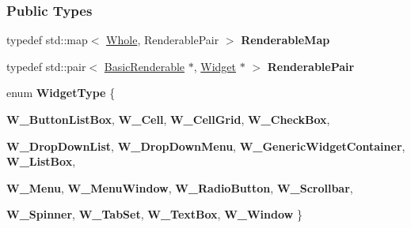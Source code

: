 \subsubsection*{Public Types}
\begin{DoxyCompactItemize}
\item 
\hypertarget{classMezzanine_1_1UI_1_1Widget_a282a075eb1009f0eea9ad51a1039629e}{
typedef std::map$<$ \hyperlink{namespaceMezzanine_adcbb6ce6d1eb4379d109e51171e2e493}{Whole}, RenderablePair $>$ {\bfseries RenderableMap}}
\label{classMezzanine_1_1UI_1_1Widget_a282a075eb1009f0eea9ad51a1039629e}

\item 
\hypertarget{classMezzanine_1_1UI_1_1Widget_ae53011568daa632baad850b24427f937}{
typedef std::pair$<$ \hyperlink{classMezzanine_1_1UI_1_1BasicRenderable}{BasicRenderable} $\ast$, \hyperlink{classMezzanine_1_1UI_1_1Widget}{Widget} $\ast$ $>$ {\bfseries RenderablePair}}
\label{classMezzanine_1_1UI_1_1Widget_ae53011568daa632baad850b24427f937}

\item 
enum {\bfseries WidgetType} \{ \par
{\bfseries W\_\-ButtonListBox}, 
{\bfseries W\_\-Cell}, 
{\bfseries W\_\-CellGrid}, 
{\bfseries W\_\-CheckBox}, 
\par
{\bfseries W\_\-DropDownList}, 
{\bfseries W\_\-DropDownMenu}, 
{\bfseries W\_\-GenericWidgetContainer}, 
{\bfseries W\_\-ListBox}, 
\par
{\bfseries W\_\-Menu}, 
{\bfseries W\_\-MenuWindow}, 
{\bfseries W\_\-RadioButton}, 
{\bfseries W\_\-Scrollbar}, 
\par
{\bfseries W\_\-Spinner}, 
{\bfseries W\_\-TabSet}, 
{\bfseries W\_\-TextBox}, 
{\bfseries W\_\-Window}
 \}
\end{DoxyCompactItemize}
